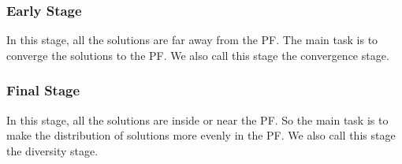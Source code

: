 \documentclass[conference]{IEEEtran}
\begin{document}
\subsubsection{Early Stage} In this stage, 
all the solutions are far away from the PF.
The main task is to converge the solutions to the PF.
We also call this stage the convergence stage.
\subsubsection{Final Stage} In this stage,
all the solutions are inside or near the PF. 
So the main task is to make the distribution of solutions more evenly in the PF.
We also call this stage the diversity stage.

%
% 
\end{document}
